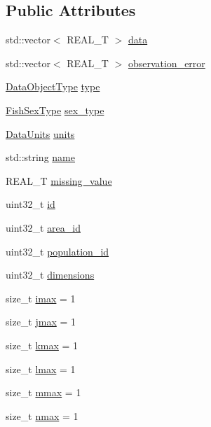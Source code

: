 \subsection*{Public Attributes}
\begin{DoxyCompactItemize}
\item 
std\-::vector$<$ R\-E\-A\-L\-\_\-\-T $>$ \hyperlink{structmas_1_1_data_object_afe358cb0a24648f460aab025b8d84cfa}{data}
\item 
std\-::vector$<$ R\-E\-A\-L\-\_\-\-T $>$ \hyperlink{structmas_1_1_data_object_a030964e2f8db36cc6e9caa251c74eac5}{observation\-\_\-error}
\item 
\hyperlink{namespacemas_a011cdbd288b3370538941f20c874de27}{Data\-Object\-Type} \hyperlink{structmas_1_1_data_object_a7cb55ace324439fd5c669d9c9e8bdb41}{type}
\item 
\hyperlink{namespacemas_a177aaabcef4ec0c3f390a7c9f6ad563b}{Fish\-Sex\-Type} \hyperlink{structmas_1_1_data_object_a33c8e663026364c72e23fa5d17b924e3}{sex\-\_\-type}
\item 
\hyperlink{namespacemas_a7e15982b9bc2fc35b571bceea4f85a6b}{Data\-Units} \hyperlink{structmas_1_1_data_object_a110ce699c4ed8de93533118b35927413}{units}
\item 
std\-::string \hyperlink{structmas_1_1_data_object_aa8aa73fed0094e9eb06dcc9aff390908}{name}
\item 
R\-E\-A\-L\-\_\-\-T \hyperlink{structmas_1_1_data_object_a02a3810366fbf0a3732e8dd84d80f39e}{missing\-\_\-value}
\item 
uint32\-\_\-t \hyperlink{structmas_1_1_data_object_abd3f89ad1237a3c419b2b9890f4236b2}{id}
\item 
uint32\-\_\-t \hyperlink{structmas_1_1_data_object_a58e3f9b4cf341c63024ee00b32bbe524}{area\-\_\-id}
\item 
uint32\-\_\-t \hyperlink{structmas_1_1_data_object_ae60deac02bbbc9ca0b0fc0faf8b34ce5}{population\-\_\-id}
\item 
uint32\-\_\-t \hyperlink{structmas_1_1_data_object_af16f06b92cad5470eee7d190ec0ffac9}{dimensions}
\item 
size\-\_\-t \hyperlink{structmas_1_1_data_object_a6249505c68ed35ad5e11c4cafd8eaa86}{imax} = 1
\item 
size\-\_\-t \hyperlink{structmas_1_1_data_object_aef9f72f453df6f2796e415306cee441e}{jmax} = 1
\item 
size\-\_\-t \hyperlink{structmas_1_1_data_object_a01bdbd0efce9891dac23e3beb746e2a9}{kmax} = 1
\item 
size\-\_\-t \hyperlink{structmas_1_1_data_object_a5b9a9d140f5378c98c10c1abd0c89bbc}{lmax} = 1
\item 
size\-\_\-t \hyperlink{structmas_1_1_data_object_aad1fab74aa21aaed012c6d50a77a8077}{mmax} = 1
\item 
size\-\_\-t \hyperlink{structmas_1_1_data_object_aee973c338436ee4ee27a23a4bd855286}{nmax} = 1
\end{DoxyCompactItemize}


